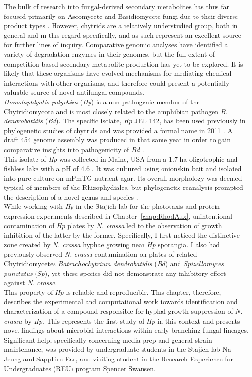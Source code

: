 \indent The bulk of research into fungal-derived secondary metabolites has thus far focused primarily on Ascomycete and Basidiomycete fungi due to their diverse product types \cite{Berdy2012}. However, chytrids are a relatively understudied group, both in general and in this regard specifically, and as such represent an excellent source for further lines of inquiry. Comparative genomic analyses have identified a variety of degradation enzymes in their genomes, but the full extent of competition-based secondary metabolite production has yet to be explored. It is likely that these organisms have evolved mechanisms for mediating chemical interactions with other organisms, and therefore could present a potentially valuable source of novel antifungal compounds.\\
\indent \textit{Homolaphlyctis polyrhiza} (\textit{Hp}) is a non-pathogenic member of the Chytridiomycota and is most closely related to the amphibian pathogen \textit{B. dendrobatidis} (\textit{Bd}). The specific isolate, \textit{Hp} JEL 142, has been used previously in phylogenetic studies of chytrids \cite{James2000,James2006,Letcher2008} and was provided a formal name in 2011 \cite{Longcore2011}. A draft 454 genome assembly was produced in that same year in order to gain comparative insights into pathogenicity of \textit{Bd} \cite{Joneson2011}.\\
\indent This isolate of \textit{Hp} was collected in Maine, USA from a 1.7 ha oligotrophic and fishless lake with a pH of 4.6 \cite{Davis1994,Rhodes1995}. It was cultured using onionskin bait and isolated into pure culture on mPmTG nutrient agar. Its overall morphology was deemed typical of members of the Rhizophydiales, but phylogenetic reanalysis prompted the description of a novel genus and species \cite{Longcore2011}.\\
\indent While working with \textit{Hp} in the Stajich lab for the phototaxis and protein expression experiments described in Chapter~\ref{chap:RhodAux}, unintentional contamination of \textit{Hp} plates by \textit{N. crassa} led to the observation of growth inhibition of the latter by the former. Specifically, I first noticed the distinctive zone created by \textit{N. crassa} hyphae growing near \textit{Hp} sporangia. I also had previously observed \textit{N. crassa} contamination on plates of related Chytridiomycetes \textit{Batrachochytrium dendrobatidis} (\textit{Bd}) and \textit{Spizellomyces punctatus} (\textit{Sp}), yet these species did not demonstrate any inhibitory effect against \textit{N. crassa}.\\
\indent This property of \textit{Hp} is reliable and reproducible. This chapter, therefore, describes the experimental and computational work towards identification and characterization of a compound responsible for hyphal growth suppression of \textit{N. crassa} by \textit{Hp}. This represents the first study of \textit{Hp} in this context and presents novel findings about microbial interactions within early branching fungal lineages. Significant help, specifically concerning media prep and general strain maintenance, was provided by undergraduate students in the Stajich lab Na Jeong and Sapphire Ear, and visiting student in the Research Experience for Undergraduates (REU) program Spencer Swansen.\\
